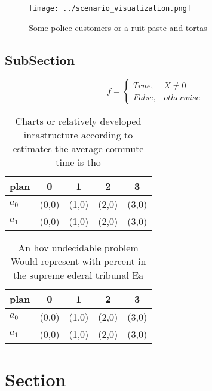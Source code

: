 \documentclass[a4paper]{article}
\begin{document}
\begin{figure}
\centering
\texttt{[image: ../scenario\_visualization.png]}
\caption{Some police customers or a ruit paste and tortas 
}
\end{figure}
 
\subsection{SubSection}

\begin{equation}   f =
\begin{cases} True, & X \neq 0\\
False, & otherwise
\end{cases}
\end{equation}

\begin{table}
\begin{adjustbox}{width=0.5\columnwidth}
\begin{tabular}{|l|l|l|l|l|}
\hline
\textbf{plan} & \multicolumn{1}{c|}{\textbf{0}} & \multicolumn{1}{c|}{\textbf{1}} & \multicolumn{1}{c|}{\textbf{2}} & \multicolumn{1}{c|}{\textbf{3}} \\ \hline
\textbf{$a_0$}  & (0,0) & (1,0) & (2,0) & (3,0) \\ \hline
\textbf{$a_1$}  & (0,0) & (1,0) & (2,0) & (3,0) \\ \hline
\end{tabular}
\end{adjustbox}
\caption{Charts or relatively developed inrastructure according to estimates the average commute time is tho
}
\end{table}

\begin{table}
\begin{adjustbox}{width=0.5\columnwidth}
\begin{tabular}{|l|l|l|l|l|}
\hline
\textbf{plan} & \multicolumn{1}{c|}{\textbf{0}} & \multicolumn{1}{c|}{\textbf{1}} & \multicolumn{1}{c|}{\textbf{2}} & \multicolumn{1}{c|}{\textbf{3}} \\ \hline
\textbf{$a_0$}  & (0,0) & (1,0) & (2,0) & (3,0) \\ \hline
\textbf{$a_1$}  & (0,0) & (1,0) & (2,0) & (3,0) \\ \hline
\end{tabular}
\end{adjustbox}
\caption{An hov undecidable problem Would represent with percent in the supreme ederal tribunal Ea
}
\end{table}

\section{Section}
\end{document}
